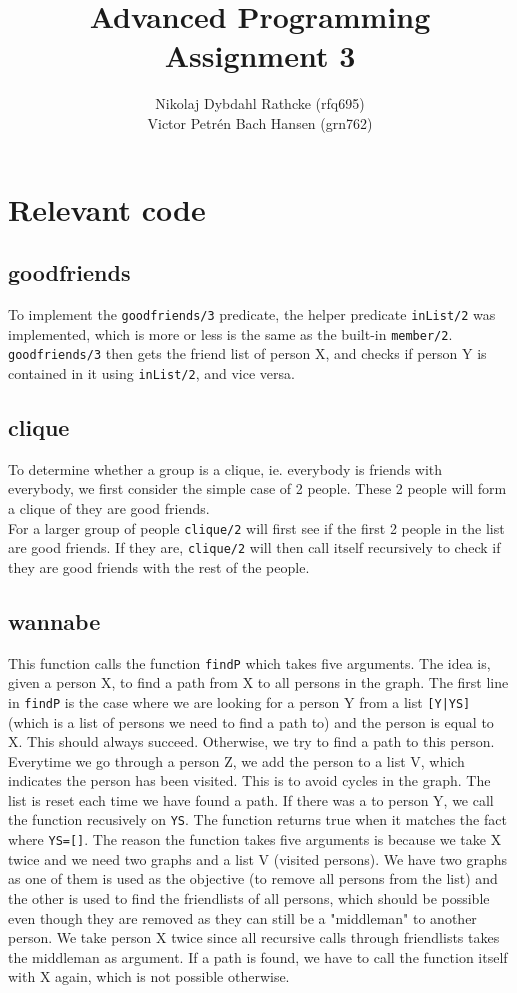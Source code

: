 \documentclass[a4paper]{article}
\author{Nikolaj Dybdahl Rathcke (rfq695) \\ Victor Petrén Bach Hansen (grn762)}
\title{Advanced Programming \\ Assignment 3}
\begin{document}
\maketitle

\section*{Relevant code}

\subsection*{goodfriends}
To implement the \texttt{goodfriends/3} predicate, the helper predicate \texttt{inList/2} was implemented, which is more or less is the same as the built-in \texttt{member/2}.\\
\texttt{goodfriends/3} then gets the friend list of person X, and checks if person Y is contained in it using \texttt{inList/2}, and vice versa.

\subsection*{clique}
To determine whether a group is a clique, ie. everybody is friends with everybody, we first consider the simple case of 2 people. These 2 people will form a clique of they are good friends.\\
For a larger group of people \texttt{clique/2} will first see if the first 2 people in the list are good friends. If they are, \texttt{clique/2} will then call itself recursively to check if they are good friends with the rest of the people.

\subsection*{wannabe} This function calls the function \texttt{findP} which takes five arguments. The idea is, given a person X, to find a path from X to all persons in the graph. The first line in \texttt{findP} is the case where we are looking for a person Y from a list \texttt{[Y|YS]} (which is a list of persons we need to find a path to) and the person is equal to X. This should always succeed. Otherwise, we try to find a path to this person. Everytime we go through a person Z, we add the person to a list V, which indicates the person has been visited. This is to avoid cycles in the graph. The list is reset each time we have found a path. If there was a to person Y, we call the function recusively on \texttt{YS}. The function returns true when it matches the fact where \texttt{YS=[]}.
The reason the function takes five arguments is because we take X twice and we need two graphs and a list V (visited persons). We have two graphs as one of them is used as the objective (to remove all persons from the list) and the other is used to find the friendlists of all persons, which should be possible even though they are removed as they can still be a "middleman" to another person. We take person X twice since all recursive calls through friendlists takes the middleman as argument. If a path is found, we have to call the function itself with X again, which is not possible otherwise.
\end{document}
